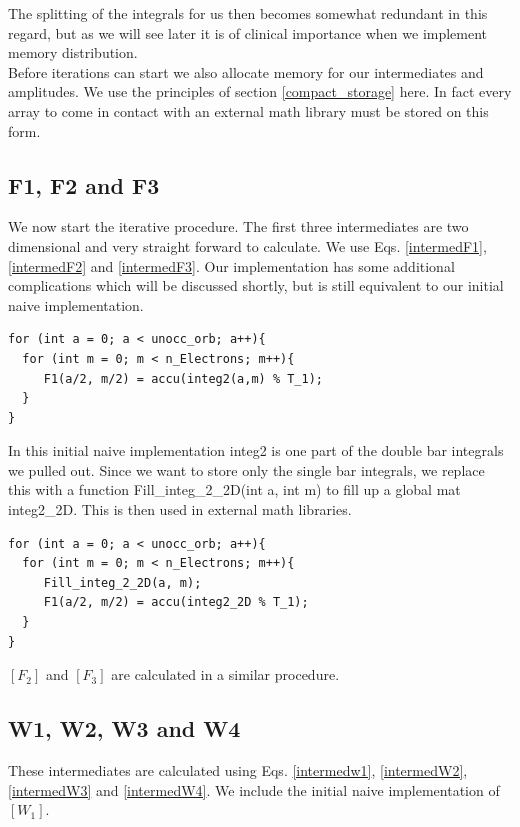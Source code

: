 \documentclass[a4paper,norsk,11pt,twoside]{report}
\begin{document}
The splitting of the integrals for us then becomes somewhat redundant in this regard, but as we will see later it is of clinical importance when we implement memory distribution. \\

Before iterations can start we also allocate memory for our intermediates and amplitudes. We use the principles of section \ref{compact_storage} here. In fact every array to come in contact with an external math library must be stored on this form.

\subsection{F1, F2 and F3}
We now start the iterative procedure. The first three intermediates are two dimensional and
very straight forward to calculate. We use Eqs. \eqref{intermedF1}, \eqref{intermedF2} and \eqref{intermedF3}. Our implementation has some additional complications which will be discussed shortly, but is still equivalent to our initial naive implementation.

\begin{lstlisting}
for (int a = 0; a < unocc_orb; a++){
  for (int m = 0; m < n_Electrons; m++){
     F1(a/2, m/2) = accu(integ2(a,m) % T_1);
  }
}
\end{lstlisting}

In this initial naive implementation integ2 is one part of the double bar integrals we pulled out. Since we want to store only the single bar integrals, we replace this with a function Fill\_integ\_2\_2D(int a, int m) to fill up a global mat integ2\_2D. This is then used in external math libraries.

\begin{lstlisting}
for (int a = 0; a < unocc_orb; a++){
  for (int m = 0; m < n_Electrons; m++){
     Fill_integ_2_2D(a, m);
     F1(a/2, m/2) = accu(integ2_2D % T_1);
  }
}
\end{lstlisting}

$[F_2]$ and $[F_3]$ are calculated in a similar procedure.

\subsection{W1, W2, W3 and W4}
These intermediates are calculated using Eqs. \eqref{intermedw1}, \eqref{intermedW2}, \eqref{intermedW3} and \eqref{intermedW4}. We include the initial naive implementation of $[W_1]$.
\end{document}
